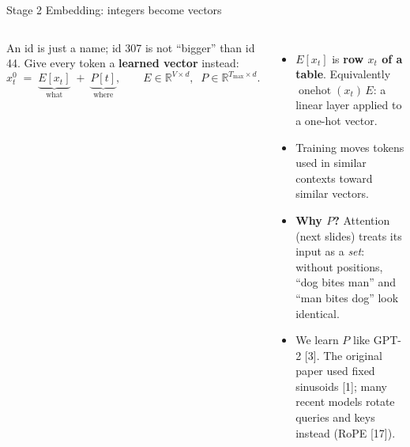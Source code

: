 \documentclass[aspectratio=169,10pt]{beamer}
\newcommand{\R}{\mathbb{R}}
\renewcommand{\cite}[1]{{\scriptsize\color{cTok}[#1]}}
\newcommand{\key}[1]{\textbf{\color{cAtt}#1}}
\begin{document}
\begin{frame}{Stage 2 \textbullet{} Embedding: integers become vectors}
\begin{columns}[T,onlytextwidth]
\small
An id is just a name; id 307 is not ``bigger'' than id 44. Give every token a
\textbf{learned vector} instead:
\[
  x^0_t \;=\; \underbrace{E[x_t]}_{\text{what}} \;+\; \underbrace{P[t]}_{\text{where}},
  \qquad E\in\R^{V\times d},\;\; P\in\R^{T_{\max}\times d}.
\]
\begin{itemize}
  \item $E[x_t]$ is \textbf{row $x_t$ of a table}. Equivalently
        $\operatorname{onehot}(x_t)\,E$: a linear layer applied to a one-hot vector.
  \item Training moves tokens used in similar contexts toward similar vectors.
  \item \key{Why $P$?} Attention (next slides) treats its input as a \emph{set}: without
        positions, ``dog bites man'' and ``man bites dog'' look identical.
  \item We learn $P$ like GPT-2 \cite{3}. The original paper used fixed sinusoids \cite{1};
        many recent models rotate queries and keys instead (RoPE \cite{17}).
\end{itemize}
\centering
{}


\end{columns}
\end{frame}
\end{document}
